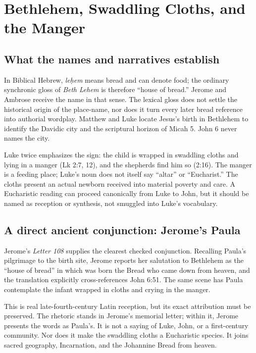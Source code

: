 \section{Bethlehem, Swaddling Cloths, and the Manger}

\subsection{What the names and narratives establish}

In Biblical Hebrew, \emph{leḥem} means bread and can denote food; the ordinary
synchronic gloss of \emph{Beth Lehem} is therefore ``house of bread.'' Jerome
and Ambrose receive the name in that sense. The lexical gloss does not settle
the historical origin of the place-name, nor does it turn every later bread
reference into authorial wordplay. Matthew and Luke locate Jesus's birth in
Bethlehem to identify the Davidic city and the scriptural horizon of Micah 5.
John 6 never names the city.

Luke twice emphasizes the sign: the child is wrapped in swaddling cloths and
lying in a manger (Lk 2:7, 12), and the shepherds find him so (2:16). The
manger is a feeding place; Luke's noun does not itself say ``altar'' or
``Eucharist.'' The cloths present an actual newborn received into material
poverty and care. A Eucharistic reading can proceed canonically from Luke to
John, but it should be named as reception or synthesis, not smuggled into
Luke's vocabulary.

\subsection{A direct ancient conjunction: Jerome's Paula}

Jerome's \emph{Letter 108} supplies the clearest checked conjunction. Recalling
Paula's pilgrimage to the birth site, Jerome reports her salutation to
Bethlehem as the ``house of bread'' in which was born the Bread who came down
from heaven, and the translation explicitly cross-references John 6:51. The
same scene has Paula contemplate the infant wrapped in cloths and crying in the
manger.

This is real late-fourth-century Latin reception, but its exact attribution
must be preserved. The rhetoric stands in Jerome's memorial letter; within it,
Jerome presents the words as Paula's. It is not a saying of Luke, John, or a
first-century community. Nor does it make the swaddling cloths a Eucharistic
species. It joins sacred geography, Incarnation, and the Johannine Bread from
heaven.

